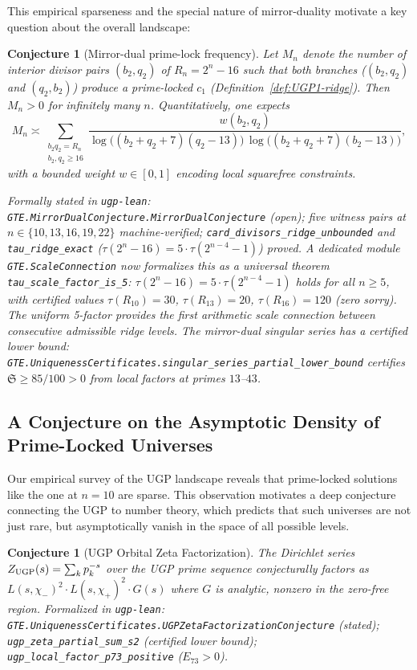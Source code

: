 \documentclass[12pt]{article}
\newtheorem{conjecture}[theorem]{Conjecture}
\numberwithin{equation}{section}
\begin{document}
This empirical sparseness and the special nature of mirror-duality motivate a key question about the overall landscape:

\begin{conjecture}[Mirror-dual prime-lock frequency]\label{conj:mirror-frequency}
Let $M_n$ denote the number of interior divisor pairs $(b_2,q_2)$ of $R_n=2^n-16$ such that both branches ($(b_2,q_2)$ and $(q_2,b_2)$) produce a prime-locked $c_1$ (Definition~\ref{def:UGP1-ridge}). Then $M_n>0$ for infinitely many $n$.
Quantitatively, one expects
\[
M_n \asymp \sum_{\substack{b_2 q_2=R_n\\ b_2,q_2\ge 16}} \frac{w(b_2,q_2)}{\log\!\big((b_2+q_2+7)(q_2-13)\big)\,\log\!\big((b_2+q_2+7)(b_2-13)\big)},
\]
with a bounded weight $w\in[0,1]$ encoding local squarefree constraints.

\noindent\emph{Formally stated in} \texttt{ugp-lean}: \texttt{GTE.MirrorDualConjecture.MirrorDualConjecture} (open); five witness pairs at $n\in\{10,13,16,19,22\}$ machine-verified; \texttt{card\_divisors\_ridge\_unbounded} and \texttt{tau\_ridge\_exact} ($\tau(2^n-16)=5\cdot\tau(2^{n-4}-1)$) proved.  A dedicated module \texttt{GTE.ScaleConnection} now formalizes this as a universal theorem \texttt{tau\_scale\_factor\_is\_5}: $\tau(2^n-16) = 5\cdot\tau(2^{n-4}-1)$ holds for all $n\ge 5$, with certified values $\tau(R_{10})=30$, $\tau(R_{13})=20$, $\tau(R_{16})=120$ (zero sorry).  The uniform 5-factor provides the first arithmetic scale connection between consecutive admissible ridge levels. The mirror-dual singular series has a certified lower bound: \texttt{GTE.UniquenessCertificates.singular\_series\_partial\_lower\_bound} certifies $\mathfrak{S}\ge 85/100>0$ from local factors at primes $13$--$43$.
\end{conjecture}

\subsection{A Conjecture on the Asymptotic Density of Prime-Locked Universes}
Our empirical survey of the UGP landscape reveals that prime-locked solutions like the one at $n=10$ are sparse. This observation motivates a deep conjecture connecting the UGP to number theory, which predicts that such universes are not just rare, but asymptotically vanish in the space of all possible levels.

\begin{conjecture}[UGP Orbital Zeta Factorization]
The Dirichlet series $Z_{\rm UGP}(s)=\sum_k p_k^{-s}$ over the UGP prime sequence conjecturally factors as $L(s,\chi_-)^2\cdot L(s,\chi_+)^2\cdot G(s)$ where $G$ is analytic, nonzero in the zero-free region. \noindent\emph{Formalized in} \texttt{ugp-lean}: \texttt{GTE.UniquenessCertificates.UGPZetaFactorizationConjecture} (stated); \texttt{ugp\_zeta\_partial\_sum\_s2} (certified lower bound); \texttt{ugp\_local\_factor\_p73\_positive} ($E_{73}>0$).
\end{conjecture}
\end{document}

